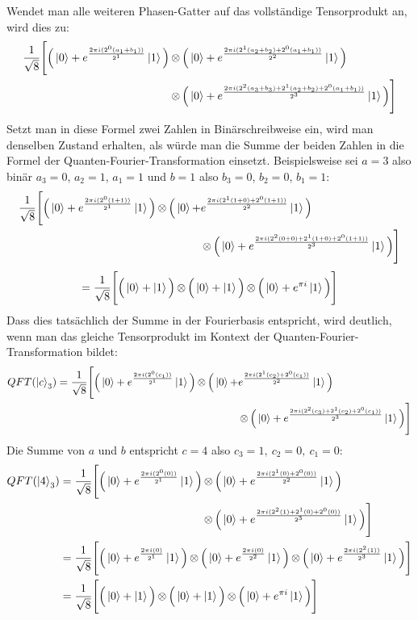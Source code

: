 Wendet man alle weiteren Phasen-Gatter auf das vollständige Tensorprodukt an, 
wird dies zu:
\begin{align*}
    \frac{1}{\sqrt{8}} 
    \Bigg[ 
      \Big(\ket{0} + { e^{\frac{2 \pi i (2^0(a_1+b_1))}{2^1}}}\ket{1} \Big) 
      &\operatorname{\otimes}
      \Big( \ket{0} + { e^{\frac{2 \pi i (2^1(a_2+b_2)+2^0(a_1+b_1))}{2^2}}}\ket{1} \Big)\\ 
      &\operatorname{\otimes}
      \Big( \ket{0} + { e^{\frac{2 \pi i (2^{2}(a_3+b_3) +2^1(a_2+b_2)+2^0(a_1+b_1))}{2^3}}}\ket{1} \Big) 
    \Bigg]
\end{align*}
Setzt man in diese Formel zwei Zahlen in Binärschreibweise ein, 
wird man denselben Zustand erhalten,
als würde man die Summe der beiden Zahlen in die Formel der Quanten-Fourier-Transformation einsetzt.
Beispielsweise sei \(a = 3\) also binär \(a_3 = 0\), \(a_2 = 1\), \(a_1 = 1\) und 
\(b = 1\) also \(b_3 = 0\), \(b_2 = 0\), \(b_1 = 1\):
\begin{align*}
\frac{1}{\sqrt{8}} 
\Bigg[ \Big(\ket{0} + { e^{\frac{2 \pi i (2^0(1+1))}{2^1}}}\ket{1} \Big) 
\operatorname{\otimes}
\Big( \ket{0} + &{ e^{\frac{2 \pi i (2^1(1+0)+2^0(1+1))}{2^2}}}\ket{1} \Big) \\
&\operatorname{\otimes}
\Big( \ket{0} + { e^{\frac{2 \pi i (2^{2}(0+0) +2^1(1+0)+2^0(1+1))}{2^3}}}\ket{1} \Big) 
\Bigg]
\end{align*}
\[
=\frac{1}{\sqrt{8}} 
\Bigg[ \Big(\ket{0} + \ket{1} \Big) \operatorname{\otimes}
\Big( \ket{0} +   \ket{1} \Big) \operatorname{\otimes}
\Big( \ket{0} +  e^{\pi i }\ket{1} \Big) 
\Bigg]
\]
Dass dies tatsächlich der Summe in der Fourierbasis entspricht, wird deutlich, 
wenn man das gleiche Tensorprodukt im Kontext der Quanten-Fourier-Transformation bildet:
\begin{align*}
    QFT(\ket{c}_3) = 
    \frac{1}{\sqrt{8}} 
    \Bigg[ \Big(\ket{0} + { e^{\frac{2 \pi i (2^0(c_1))}{2^1}}}\ket{1} \Big) 
    \operatorname{\otimes}
    \Big( \ket{0} + &{ e^{\frac{2 \pi i (2^1(c_2)+2^0(c_1))}{2^2}}}\ket{1} \Big) \\
    &\operatorname{\otimes}
    \Big( \ket{0} + { e^{\frac{2 \pi i (2^{2}(c_3) +2^1(c_2)+2^0(c_1))}{2^3}}}\ket{1} \Big) 
\Bigg]
\end{align*}
Die Summe von \(a\) und \(b\) entspricht \(c = 4\) also \(c_3 = 1,~c_2 = 0,~c_1=0\):
\begin{align*}
    QFT(\ket{4}_3) &=
    \begin{aligned}[t]
      \frac{1}{\sqrt{8}} \Bigg[ \Big(\ket{0} + { e^{\frac{2 \pi i (2^0(0))}{2^1}}}\ket{1} \Big) 
      &\operatorname{\otimes}
      \Big( \ket{0} + { e^{\frac{2 \pi i (2^1(0)+2^0(0))}{2^2}}}\ket{1} \Big) \\
      &\operatorname{\otimes}
      \Big( \ket{0} + { e^{\frac{2 \pi i (2^{2}(1) +2^1(0)+2^0(0))}{2^3}}}\ket{1} \Big) \Bigg]
    \end{aligned} \\
    &= 
    \frac{1}{\sqrt{8}} \Bigg[ \Big(\ket{0} + { e^{\frac{2 \pi i (0)}{2^1}}}\ket{1} \Big) 
    \operatorname{\otimes}
    \Big( \ket{0} + { e^{\frac{2 \pi i (0)}{2^2}}}\ket{1} \Big) 
    \operatorname{\otimes}
    \Big( \ket{0} + { e^{\frac{2 \pi i (2^{2}(1))}{2^3}}}\ket{1} \Big) \Bigg] \\
    &=\frac{1}{\sqrt{8}} \Bigg[ \Big(\ket{0} + \ket{1} \Big) 
    \operatorname{\otimes}
    \Big( \ket{0} +   \ket{1} \Big) 
    \operatorname{\otimes}
    \Big( \ket{0} +  e^{\pi i }\ket{1} \Big) \Bigg]
\end{align*}
